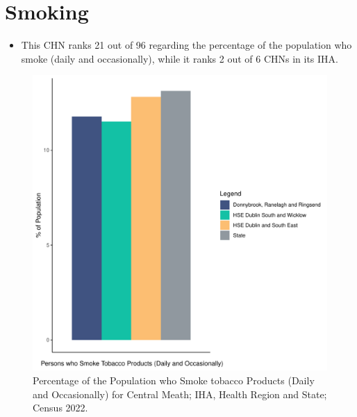 \documentclass{article}
\begin{document}
\pagebreak

\section{Smoking}\label{sect:Smoking}
\begin{itemize}
\item This CHN ranks  21 out of 96 regarding the percentage of the population who smoke (daily and occasionally), while it ranks   2 out of 6 CHNs in its IHA.
\end{itemize}
\begin{figure}[H]
	\centering
	\includegraphics[width = 120mm]{../figures/SmokingED.pdf}
	\caption{Percentage of the Population who Smoke tobacco Products (Daily and Occasionally) for Central Meath; IHA, Health Region and State; Census 2022.}
	\label{fig:2ae19629-1a6a-13a3-e055-000000000001}
	\end{figure}
	
\end{document}

